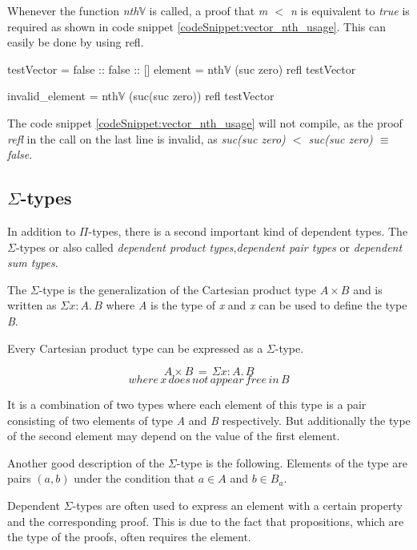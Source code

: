 Whenever the function \emph{nth$\mathbb{V}$} is called, a proof that \emph{m $<$ n} is equivalent to \emph{true} is required as shown in code snippet \ref{codeSnippet:vector_nth_usage}. This can easily be done by using refl.

\begin{codesnippet}[mathescape=true, caption={Usage of \emph{nth} function in Agda}, label={codeSnippet:vector_nth_usage}]
testVector = false :: false :: []
element = nth$\mathbb{V}$ (suc zero) refl testVector

invalid_element = nth$\mathbb{V}$ (suc(suc zero)) 
                  refl testVector
\end{codesnippet}

The code snippet \ref{codeSnippet:vector_nth_usage} will not compile, as the proof \emph{refl} in the call on the last line is invalid, as \emph{suc(suc zero) $<$ suc(suc zero) $\equiv$ false}.

\subsection{$\Sigma$-types}
In addition to $\Pi$-types, there is a second important kind of dependent types. 
The $\Sigma$-types or also called \emph{dependent product types}\cite{10.1145/2841316},\emph{dependent pair types}\cite{10.1145/2841316} or \emph{dependent sum types}\cite{10.5555/1076265}.

The $\Sigma$-type is the generalization of the Cartesian product type $A \times B$ and is written as $\Sigma x:A. \, B$ where \emph{A} is the type of \emph{x} and \emph{x} can be used to define the type \emph{B}.

Every Cartesian product type can be expressed as a $\Sigma$-type.

$$A \times B \,= \,\Sigma x:A. \, B$$
$$where \, x \, does \, not \, appear \, free \, in \, B$$

It is a combination of two types where each element of this type is a pair consisting of two elements of type \emph{A} and \emph{B} respectively.
But additionally the type of the second element may depend on the value of the first element.

Another good description of the $\Sigma$-type is the following. 
Elements of the type are pairs $(a, b)$ under the condition that $a \in A$ and $b \in B_a$.

Dependent $\Sigma$-types are often used to express an element with a certain property and the corresponding proof.
This is due to the fact that propositions, which are the type of the proofs, often requires the element.

